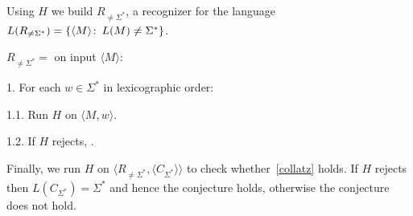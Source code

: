 Using \(H\) we build \(R_{\neq \Sigma^*}\), a recognizer for the language
\(L(R_{\neq \Sigma^*}) = \{\langle M\rangle\colon\, L(M) \neq \Sigma^*\}\).

\begin{TMachine}{\(R_{\neq \Sigma^*} =\) on input \(\langle M \rangle\):}
	\item[1.] For each \(w \in \Sigma^*\) in lexicographic order:
	\item[1.1.] Run \(H\) on \(\langle M , w \rangle\).
	\item[1.2.] If \(H\) rejects, \accept.
\end{TMachine}

Finally, we run \(H\) on \(\langle R_{\neq \Sigma^*}, \langle C_{\Sigma^*} \rangle
		\rangle\) to check whether~\ref{collatz} holds. If \(H\) rejects then
		\(L(C_{\Sigma^*}) = \Sigma^*\) and hence the conjecture holds, otherwise the
		conjecture does not hold.
